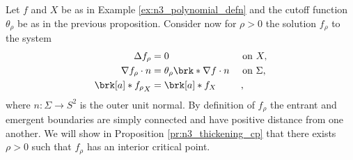 \begin{example}
  \label{ex:n3_thickening}
  Let $f$ and $X$ be as in Example \ref{ex:n3_polynomial_defn} and the cutoff function $\theta_\rho$ be as in
  the previous proposition.
  Consider now for $\rho>0$ the solution $f_\rho$ to the system
  \begin{align*}
    \Delta f_\rho&=0 &&\text{ on }X, \\
    \nabla f_\rho\cdot n&=\theta_\rho\brk*{\nabla f\cdot n} &&\text{ on }\Sigma, \\
    \brk[a]*{f_\rho}_X&=\brk[a]*{f}_X &&\,,
  \end{align*}
  where $n\colon\Sigma\to S^2$ is the outer unit normal.
  By definition of $f_\rho$ the entrant and emergent boundaries are simply connected
  and have positive distance from one another.
  We will show in Proposition \ref{pr:n3_thickening_cp} that there exists $\rho>0$ such that $f_\rho$ has an interior
  critical point.
\end{example}

